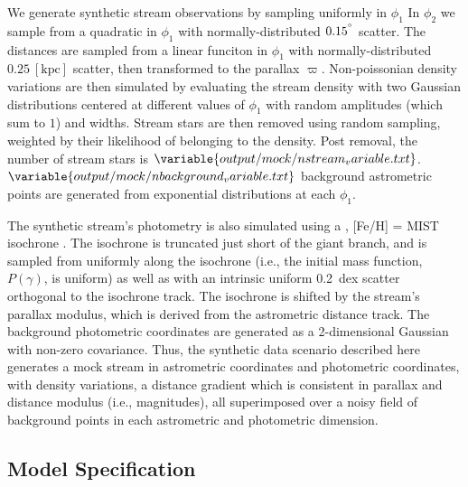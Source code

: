 \documentclass[twocolumn]{aastex631}
\newcommand{\unit}[1]{[\text{#1}]}
\newcommand{\parallax}{\varpi}
\begin{document}
        We generate synthetic stream observations by sampling uniformly in $\phi_1$
        In $\phi_2$ we sample from a quadratic in $\phi_1$ with normally-distributed
        $0.15^{\degree}$ scatter.  The distances are sampled from a linear funciton in
        $\phi_1$ with normally-distributed $0.25 \ \unit{kpc}$ scatter, then
        transformed to the parallax $\parallax$.  Non-poissonian density variations
        are then simulated by evaluating the stream density with two Gaussian
        distributions centered at different values of $\phi_1$ with random
        amplitudes (which sum to $1$) and widths.  Stream stars are then removed
        using random sampling, weighted by their likelihood of belonging to the
        density. Post removal, the number of stream stars is
        $\variable{output/mock/nstream_variable.txt}$.
        $\variable{output/mock/nbackground_variable.txt}$ background astrometric points
        are generated from exponential distributions at each $\phi_1$.
    
        The synthetic stream's photometry is also simulated using a
        ,
        [Fe/H] =  MIST isochrone
        \citep{brutus, Dotter2016, Choi+2016}. The isochrone is truncated just
        short of the giant branch, and is sampled from uniformly along the isochrone
        (i.e., the initial mass function, $P(\gamma)$, is uniform) as well as with
        an intrinsic uniform 0.2~dex scatter orthogonal to the isochrone track. The
        isochrone is shifted by the stream's parallax modulus, which is derived from
        the astrometric distance track.  The background photometric coordinates are
        generated as a 2-dimensional Gaussian with non-zero covariance.  Thus, the
        synthetic data scenario described here generates a mock stream in
        astrometric coordinates and photometric coordinates, with density
        variations, a distance gradient which is consistent in parallax and distance
        modulus (i.e., magnitudes), all superimposed over a noisy field of
        background points in each astrometric and photometric dimension.

    \subsection{Model Specification} \label{sub:resultes_mock:model}
\end{document}

